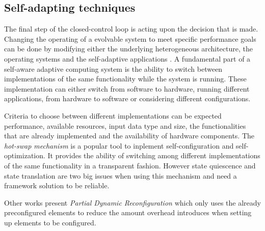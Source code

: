 \subsection{Self-adapting techniques}
\label{sec:selfadapting}

The final step of the closed-control loop is acting upon the decision that is made. Changing the operating of a evolvable system to meet specific performance goals can be done by modifying either the underlying heterogeneous architecture, the operating systems and the self-adaptive applications \cite{evolvable}. A fundamental part of a self-aware adaptive computing system is the ability to switch between implementations of the same functionality while the system is running. These implementation can either switch from software to hardware, running different applications, from hardware to software or considering different configurations. \cite{selfaware}

Criteria to choose between different implementations can be expected performance, available resources, input data type and size, the functionalities that are already implemented and the availability of hardware components. The \emph{hot-swap mechanism} is a popular tool to inplement self-configuration and self-optimization. It provides the ability of switching among different implementations of the same functionality in a transparent fashion. However state quiescence and state translation are two big issues when using this mechanism and need a framework solution to be reliable. 

Other works present \emph{Partial Dynamic Reconfiguration} \cite{reconfigurable} which only uses the already preconfigured elements to reduce the amount overhead introduces when setting up elements to be configured. 